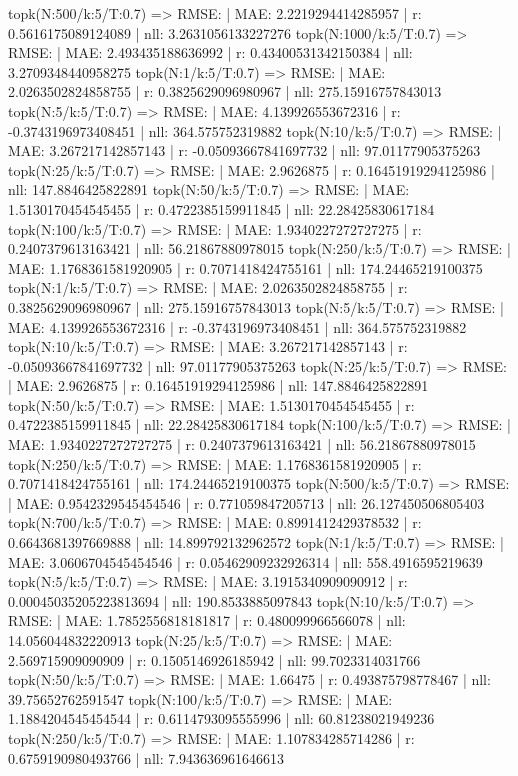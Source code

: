 topk(N:500/k:5/T:0.7) => RMSE: | MAE: 2.2219294414285957 | r: 0.5616175089124089 | nll: 3.2631056133227276
topk(N:1000/k:5/T:0.7) => RMSE: | MAE: 2.493435188636992 | r: 0.43400531342150384 | nll: 3.2709348440958275
topk(N:1/k:5/T:0.7) => RMSE: | MAE: 2.0263502824858755 | r: 0.3825629096980967 | nll: 275.15916757843013
topk(N:5/k:5/T:0.7) => RMSE: | MAE: 4.139926553672316 | r: -0.3743196973408451 | nll: 364.575752319882
topk(N:10/k:5/T:0.7) => RMSE: | MAE: 3.267217142857143 | r: -0.05093667841697732 | nll: 97.01177905375263
topk(N:25/k:5/T:0.7) => RMSE: | MAE: 2.9626875 | r: 0.16451919294125986 | nll: 147.8846425822891
topk(N:50/k:5/T:0.7) => RMSE: | MAE: 1.5130170454545455 | r: 0.4722385159911845 | nll: 22.28425830617184
topk(N:100/k:5/T:0.7) => RMSE: | MAE: 1.9340227272727275 | r: 0.2407379613163421 | nll: 56.21867880978015
topk(N:250/k:5/T:0.7) => RMSE: | MAE: 1.1768361581920905 | r: 0.7071418424755161 | nll: 174.24465219100375
topk(N:1/k:5/T:0.7) => RMSE: | MAE: 2.0263502824858755 | r: 0.3825629096980967 | nll: 275.15916757843013
topk(N:5/k:5/T:0.7) => RMSE: | MAE: 4.139926553672316 | r: -0.3743196973408451 | nll: 364.575752319882
topk(N:10/k:5/T:0.7) => RMSE: | MAE: 3.267217142857143 | r: -0.05093667841697732 | nll: 97.01177905375263
topk(N:25/k:5/T:0.7) => RMSE: | MAE: 2.9626875 | r: 0.16451919294125986 | nll: 147.8846425822891
topk(N:50/k:5/T:0.7) => RMSE: | MAE: 1.5130170454545455 | r: 0.4722385159911845 | nll: 22.28425830617184
topk(N:100/k:5/T:0.7) => RMSE: | MAE: 1.9340227272727275 | r: 0.2407379613163421 | nll: 56.21867880978015
topk(N:250/k:5/T:0.7) => RMSE: | MAE: 1.1768361581920905 | r: 0.7071418424755161 | nll: 174.24465219100375
topk(N:500/k:5/T:0.7) => RMSE: | MAE: 0.9542329545454546 | r: 0.771059847205713 | nll: 26.127450506805403
topk(N:700/k:5/T:0.7) => RMSE: | MAE: 0.8991412429378532 | r: 0.6643681397669888 | nll: 14.899792132962572
topk(N:1/k:5/T:0.7) => RMSE: | MAE: 3.0606704545454546 | r: 0.05462909232926314 | nll: 558.4916595219639
topk(N:5/k:5/T:0.7) => RMSE: | MAE: 3.1915340909090912 | r: 0.00045035205223813694 | nll: 190.8533885097843
topk(N:10/k:5/T:0.7) => RMSE: | MAE: 1.7852556818181817 | r: 0.480099966566078 | nll: 14.056044832220913
topk(N:25/k:5/T:0.7) => RMSE: | MAE: 2.569715909090909 | r: 0.1505146926185942 | nll: 99.7023314031766
topk(N:50/k:5/T:0.7) => RMSE: | MAE: 1.66475 | r: 0.493875798778467 | nll: 39.75652762591547
topk(N:100/k:5/T:0.7) => RMSE: | MAE: 1.1884204545454544 | r: 0.6114793095555996 | nll: 60.81238021949236
topk(N:250/k:5/T:0.7) => RMSE: | MAE: 1.107834285714286 | r: 0.6759190980493766 | nll: 7.943636961646613
